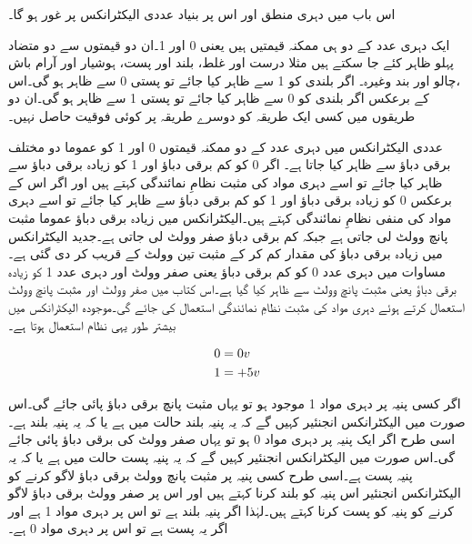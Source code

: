 
اس باب میں دہری منطق اور اس پر بنیاد عددی الیکٹرانکس پر غور ہو گا۔

ایک دہری عدد کے دو ہی ممکنہ قیمتیں ہیں یعنی 0 اور 1۔ان دو قیمتوں سے دو متضاد پہلو ظاہر کئے جا سکتے ہیں مثلا درست اور غلط، بلند اور پست، ہوشیار اور آرام باش ،چالو اور بند وغیرہ۔ اگر بلندی کو 1 سے ظاہر کیا جائے تو پستی 0 سے ظاہر ہو گی۔اس کے برعکس اگر بلندی کو 0 سے ظاہر کیا جائے تو پستی 1 سے ظاہر ہو گی۔ان دو طریقوں میں کسی ایک طریقہ کو دوسرے طریقہ پر کوئی فوقیت حاصل نہیں۔

عددی الیکٹرانکس میں دہری عدد کے دو ممکنہ قیمتوں 0 اور 1 کو عموما دو مختلف برقی دباؤ سے ظاہر کیا جاتا ہے۔  اگر 0 کو کم برقی دباؤ اور 1  کو زیادہ برقی دباؤ سے ظاہر کیا جائے تو اسے  دہری مواد کی مثبت نظامِ نمائندگی  کہتے ہیں اور اگر اس کے برعکس 0 کو زیادہ برقی دباؤ اور 1 کو کم برقی دباؤ سے ظاہر کیا جائے تو اسے دہری مواد کی منفی نظامِ نمائندگی  کہتے ہیں۔الیکٹرانکس میں زیادہ برقی دباؤ عموما مثبت پانچ وولٹ لی جاتی ہے جبکہ کم برقی دباؤ صفر وولٹ لی جاتی ہے۔جدید الیکٹرانکس میں زیادہ برقی دباؤ کی مقدار کم کر کے مثبت تین وولٹ کے قریب کر دی گئی ہے۔مساوات  میں دہری عدد 0 کو کم برقی دباؤ یعنی صفر وولٹ اور دہری عدد 1 کو زیادہ برقی دباؤ یعنی مثبت پانچ وولٹ سے ظاہر کیا گیا ہے۔اس کتاب میں صفر وولٹ اور مثبت پانچ وولٹ استعمال کرتے ہوئے دہری مواد کی مثبت نظامِ نمائندگی استعمال کی جائے گی۔موجودہ الیکٹرانکس میں بیشتر طور یہی نظام استعمال ہوتا ہے۔

\begin{align} \label{مساوات۔مثبت۔نظام۔نمائندگی}
0 &= 0 v   \notag \\
1 & = +5 v
\end{align}

اگر کسی پنیہ پر دہری مواد 1 موجود ہو تو یہاں مثبت پانچ برقی دباؤ پائی جائے گی۔اس صورت میں الیکٹرانکس انجنئیر کہیں گے کہ یہ پنیہ بلند حالت  میں ہے یا کہ یہ پنیہ بلند  ہے۔ اسی طرح اگر ایک پنیہ پر دہری مواد 0 ہو تو یہاں صفر وولٹ کی برقی دباؤ پائی جائے گی۔اس صورت میں الیکٹرانکس انجنئیر کہیں گے کہ یہ پنیہ پست حالت   میں ہے یا کہ یہ پنیہ پست  ہے۔اسی طرح کسی پنیہ پر مثبت پانچ وولٹ برقی دباؤ لاگو کرنے کو الیکٹرانکس انجنئیر  اس پنیہ کو بلند کرنا کہتے ہیں اور اس پر صفر وولٹ برقی دباؤ لاگو کرنے کو پنیہ کو پست کرنا کہتے ہیں۔لہٰذا اگر پنیہ بلند ہے تو اس پر دہری مواد 1 ہے اور اگر یہ پست ہے تو اس پر دہری مواد 0 ہے۔

